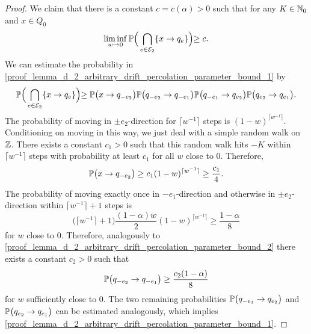 \begin{proof}
We claim that there is a constant $c=c(\alpha)>0$ such that for any $K \in \N_0$ and $x \in Q_0$
\begin{equation}\label{proof_lemma_d_2_arbitrary_drift_percolation_parameter_bound_1}
 \liminf_{w \to 0} \P\Bigr(\bigcap_{ e \in \mathcal{E}_2} \{x \to q_{e}\} \Bigl) \geq c.
\end{equation}
We can estimate the probability in \eqref{proof_lemma_d_2_arbitrary_drift_percolation_parameter_bound_1} by
\begin{equation*}
\P\Bigr(\bigcap_{e \in \mathcal{E}_2} \{x \to q_{e}\} \Bigl) \geq \P\bigl(x \to q_{-e_2} \bigr) \P\bigl(q_{-e_{2}} \to q_{-e_1} \bigr) \P\bigl(q_{-e_{1}} \to q_{e_2} \bigr) \P\bigl(q_{e_{2}} \to q_{e_1} \bigr).
\end{equation*}
The probability of moving in $\pm e_2$-direction for $\lceil w^{-1} \rceil$ steps is $(1-w)^{\lceil w^{-1} \rceil}$. Conditioning on moving in this way, we just deal with a simple random walk on $\Z$. There exists a constant $c_1>0$ such that this random walk hits $-K$ within $\lceil w^{-1} \rceil$ steps with probability at least $c_1$ for all $w$ close to $0$.
Therefore,
\begin{equation} \label{proof_lemma_d_2_arbitrary_drift_percolation_parameter_bound_2}
\P\bigl(x \to q_{-e_2} \bigr) \geq c_1 (1-w)^{\lceil w^{-1} \rceil} 
                              \geq \frac{c_1}{4}.
\end{equation}
The probability of moving exactly once in $-e_1$-direction and otherwise in $\pm e_2$-direction within $\lceil w^{-1} \rceil+1$ steps is
\begin{equation*}
\bigl(\lceil w^{-1} \rceil +1\bigr) \frac{(1-\alpha)w}{2} (1-w)^{\lceil w^{-1} \rceil} \geq \frac{1-\alpha}{8}
\end{equation*}
for $w$ close to $0$. Therefore, analogously to \eqref{proof_lemma_d_2_arbitrary_drift_percolation_parameter_bound_2} there exists a constant $c_2>0$ such that
\begin{equation*}
\P\bigl(q_{-e_2} \to q_{-e_1} \bigr) \geq \frac{c_2(1-\alpha)}{8}
\end{equation*}
for $w$ sufficiently close to $0$. The two remaining probabilities $\P\bigl(q_{-e_{1}} \to q_{e_2} \bigr)$ and $\P\bigl(q_{e_{2}} \to q_{e_1} \bigr)$ can be estimated analogously, which implies \eqref{proof_lemma_d_2_arbitrary_drift_percolation_parameter_bound_1}.


\end{proof}
